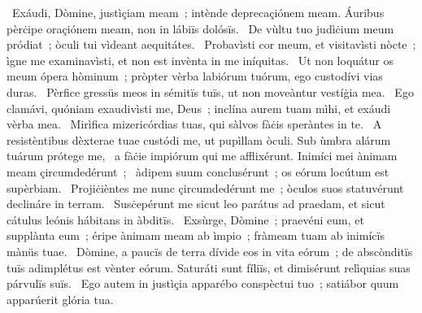 ~Exáudi, Dòmine, justìçiam meam~; intènde deprecaçiónem meam. Áuribus pèrċipe oraçiónem meam, non in lábiïs dolósïs. 
~De vùltu tuo judìċium meum pródiat~; òculi tui vìdeant aequitátes. 
~Probavìsti cor meum, et visitavìsti nòcte~; ìgne me examinavìsti, et non est invènta in me iníquitas. 
~Ut non loquátur os meum ópera hòminum~; pròpter vèrba labiórum tuórum, ego custodívi vias duras. 
~Pèrfice gressüs meos in sémitïs tuïs, ut non moveàntur vestíġia mea. 
~Ego clamávi, quóniam exaudivìsti me, Deus~; inclína aurem tuam mìhi, et exáudi vèrba mea. 
~Mirìfica mizericórdias tuas, qui sàlvos fàċis speràntes in te. 
~A resistèntibus dèxterae tuae custódi me, ut pupìllam òculi. Sub ùmbra alárum tuárum prótege me, 
~a fàċie impiórum qui me afflixérunt. Inimíci mei ànimam meam çircumdedérunt~; 
~àdipem suum conclusérunt~; os eórum locútum est supèrbiam. 
~Projiċièntes me nunc çircumdedérunt me~; òculos suos statuvérunt declináre in terram. 
~Susċepérunt me sicut leo parátus ad praedam, et sicut cátulus leónis hábitans in àbditïs. 
~Exsùrge, Dòmine~; praevéni eum, et supplànta eum~; éripe ànimam meam ab ìmpio~; fràmeam tuam ab inimícïs mànüs tuae. 
~Dòmine, a paucïs de terra dívide eos in vita eórum~; de abscònditïs tuïs adimplétus est vènter eórum. Saturáti sunt fíliïs, et dimisérunt relìquias suas párvulïs suïs. 
~Ego autem in justìçia apparébo conspèctui tuo~; satiábor quum apparúerit glória tua. 
